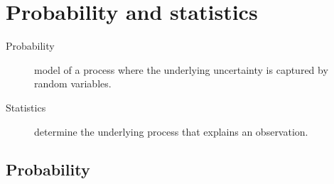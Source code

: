 \chapter{Probability and statistics}


\begin{description}
    \item[Probability]
        model of a process where the underlying uncertainty is captured by random variables.
    \item[Statistics] 
        determine the underlying process that explains an observation.
\end{description}


\section{Probability}
